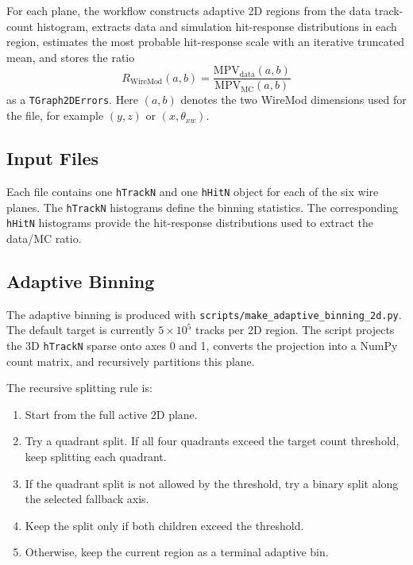 \documentclass{article}
\begin{document}
For each plane, the workflow constructs adaptive 2D regions from the data track-count histogram, extracts data and simulation hit-response distributions in each region, estimates the most probable hit-response scale with an iterative truncated mean, and stores the ratio
\begin{equation}
    R_{\mathrm{WireMod}}(a,b) =
    \frac{\mathrm{MPV}_{\mathrm{data}}(a,b)}
         {\mathrm{MPV}_{\mathrm{MC}}(a,b)}
\end{equation}
as a \texttt{TGraph2DErrors}. Here $(a,b)$ denotes the two WireMod dimensions used for the file, for example $(y,z)$ or $(x,\theta_{xw})$.

\subsection{Input Files}

Each file contains one \texttt{hTrackN} and one \texttt{hHitN} object for each of the six wire planes. The \texttt{hTrackN} histograms define the binning statistics. The corresponding \texttt{hHitN} histograms provide the hit-response distributions used to extract the data/MC ratio.

\subsection{Adaptive Binning}

The adaptive binning is produced with \texttt{scripts/make\_adaptive\_binning\_2d.py}. The default target is currently $5\times10^{5}$ tracks per 2D region. The script projects the 3D \texttt{hTrackN} sparse onto axes 0 and 1, converts the projection into a NumPy count matrix, and recursively partitions this plane.

The recursive splitting rule is:
\begin{enumerate}
    \item Start from the full active 2D plane.
    \item Try a quadrant split. If all four quadrants exceed the target count threshold, keep splitting each quadrant.
    \item If the quadrant split is not allowed by the threshold, try a binary split along the selected fallback axis.
    \item Keep the split only if both children exceed the threshold.
    \item Otherwise, keep the current region as a terminal adaptive bin.
\end{enumerate}
\end{document}
